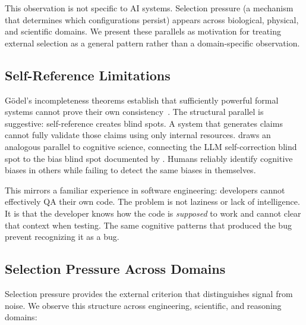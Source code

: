 \documentclass[11pt]{article}
\begin{document}
This observation is not specific to AI systems. Selection pressure (a mechanism that
determines which configurations persist) appears across biological, physical, and scientific
domains. We present these parallels as motivation for treating external selection as a
general pattern rather than a domain-specific observation.

\subsection{Self-Reference Limitations}

G\"{o}del's incompleteness theorems establish that sufficiently powerful formal systems
cannot prove their own consistency~\citep{godel1931}. The structural parallel is suggestive:
self-reference creates blind spots. A system that generates claims cannot fully validate
those claims using only internal resources. \citet{tsui2025selfcorrection} draws an
analogous parallel to cognitive science, connecting the LLM self-correction blind spot to
the bias blind spot documented by \citet{pronin2002bias}. Humans reliably identify cognitive
biases in others while failing to detect the same biases in themselves.

This mirrors a familiar experience in software engineering: developers cannot effectively QA
their own code. The problem is not laziness or lack of intelligence. It is that the developer
knows how the code is \textit{supposed} to work and cannot clear that context when testing.
The same cognitive patterns that produced the bug prevent recognizing it as a bug.

\subsection{Selection Pressure Across Domains}

Selection pressure provides the external criterion that distinguishes signal from noise. We
observe this structure across engineering, scientific, and reasoning domains:
\end{document}
